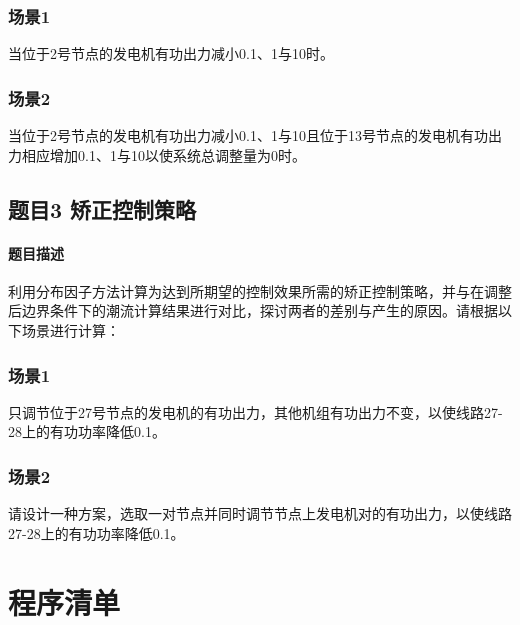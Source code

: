 \documentclass[a4paper,12pt]{article}
\begin{document}
    \subsubsection{场景1} 当位于2号节点的发电机有功出力减小0.1、1与10时。
    \subsubsection{场景2} 当位于2号节点的发电机有功出力减小0.1、1与10且位于13号节点的发电机有功出力相应增加0.1、1与10以使系统总调整量为0时。

    \subsection{题目3 矫正控制策略}
    \paragraph{题目描述} 利用分布因子方法计算为达到所期望的控制效果所需的矫正控制策略，并与在调整后边界条件下的潮流计算结果进行对比，探讨两者的差别与产生的原因。请根据以下场景进行计算：
    \subsubsection{场景1} 只调节位于27号节点的发电机的有功出力，其他机组有功出力不变，以使线路27-28上的有功功率降低0.1。
    \subsubsection{场景2} 请设计一种方案，选取一对节点并同时调节节点上发电机对的有功出力，以使线路27-28上的有功功率降低0.1。

    
    
    \appendix
    \section{程序清单}
      
      
    \label{applastpage}
\iffalse
\begin{itemize}[noitemsep,topsep=0pt]
\end{itemize}
\begin{enumerate}[label=\Roman{*}.,noitemsep,topsep=0pt]
\end{enumerate}
\begin{multicols}{2}
\end{multicols}
\begin{lstlisting}[style=Matlab-editor,basicstyle=\mlttfamily]

\end{lstlisting}
\fi
\end{document}
